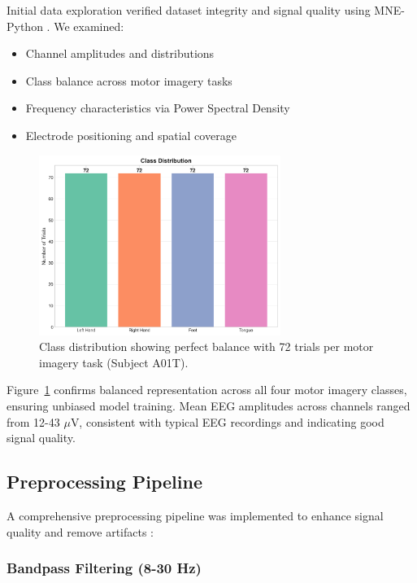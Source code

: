 \documentclass[11pt]{article}
\begin{document}
Initial data exploration verified dataset integrity and signal quality using MNE-Python \citep{gramfort2013meg}. We examined:

\begin{itemize}
    \item Channel amplitudes and distributions
    \item Class balance across motor imagery tasks
    \item Frequency characteristics via Power Spectral Density
    \item Electrode positioning and spatial coverage
\end{itemize}

\begin{figure}[H]
    \centering
    \includegraphics[width=0.7\textwidth]{../results/figures/01_class_distribution.png}
    \caption{Class distribution showing perfect balance with 72 trials per motor imagery task (Subject A01T).}
    \label{fig:class_distribution}
\end{figure}

Figure~\ref{fig:class_distribution} confirms balanced representation across all four motor imagery classes, ensuring unbiased model training. Mean EEG amplitudes across channels ranged from 12-43 $\mu$V, consistent with typical EEG recordings and indicating good signal quality.

\subsection{Preprocessing Pipeline}

A comprehensive preprocessing pipeline was implemented to enhance signal quality and remove artifacts \citep{gramfort2013meg,delorme2004eeglab}:

\subsubsection{Bandpass Filtering (8-30 Hz)}
\end{document}
